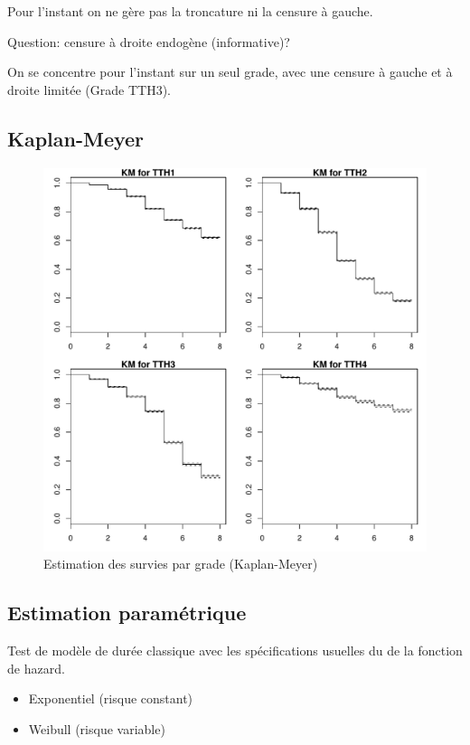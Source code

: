 \documentclass[11pt,a4paper]{article}
\begin{document}
Pour l'instant on ne gère pas la troncature ni la censure à gauche. 

Question: censure à droite endogène (informative)? 


On se concentre pour l'instant sur un seul grade, avec une censure à gauche et à droite limitée (Grade TTH3). 




\subsection*{Kaplan-Meyer}

\begin{figure}[H] 
  \caption{Estimation des survies par grade (Kaplan-Meyer)}
  \label{censure} 
    \includegraphics[scale = 0.75]{KM.pdf} 
\end{figure}



\subsection*{Estimation paramétrique}

Test de modèle de durée classique avec les spécifications usuelles du de la fonction de hazard. 
\begin{itemize}[leftmargin=1cm ,parsep=0cm,itemsep=0cm,topsep=0cm] 
\item Exponentiel (risque constant)
\item Weibull (risque variable)
\end{itemize} 
\end{document}
